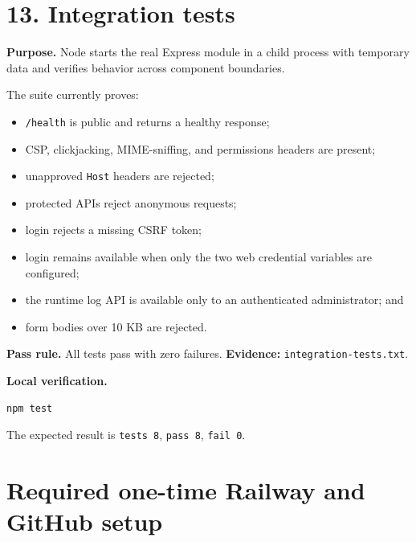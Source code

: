 \documentclass[11pt,a4paper]{article}
\newcommand{\stage}[2]{\section{#1. #2}}
\newcommand{\evidence}[1]{\textbf{Evidence:} \texttt{#1}}
\begin{document}
\stage{13}{Integration tests}

\textbf{Purpose.} Node starts the real Express module in a child process with temporary data and verifies behavior across component boundaries.

The suite currently proves:
\begin{itemize}
  \item \texttt{/health} is public and returns a healthy response;
  \item CSP, clickjacking, MIME-sniffing, and permissions headers are present;
  \item unapproved \texttt{Host} headers are rejected;
  \item protected APIs reject anonymous requests;
  \item login rejects a missing CSRF token;
  \item login remains available when only the two web credential variables are configured;
  \item the runtime log API is available only to an authenticated administrator; and
  \item form bodies over 10 KB are rejected.
\end{itemize}

\textbf{Pass rule.} All tests pass with zero failures. \evidence{integration-tests.txt}.

\textbf{Local verification.}
\begin{lstlisting}
npm test
\end{lstlisting}
The expected result is \texttt{tests 8}, \texttt{pass 8}, \texttt{fail 0}.

\section{Required one-time Railway and GitHub setup}
\end{document}
